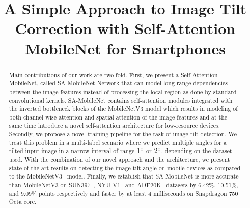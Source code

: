 \documentclass{bmvc2k}
\title{A Simple Approach to Image Tilt Correction with Self-Attention MobileNet for Smartphones}
\begin{document}
\maketitle

\begin{abstract}
Main contributions of our work are two-fold. First, we present a Self-Attention MobileNet, called SA-MobileNet Network that can model long-range dependencies between the image features instead of processing the local region as done by standard convolutional kernels. 
SA-MobileNet contains self-attention modules integrated with the inverted bottleneck blocks of the MobileNetV3 model which results in modeling of both channel-wise attention and spatial attention of the image features and at the same time introduce a novel self-attention architecture for low-resource devices. Secondly, we propose a novel training pipeline for the task of image tilt detection. We treat this problem in a multi-label scenario where we predict multiple angles for a tilted input image in a narrow interval of range $1\degree$ or $2\degree$, depending on the dataset used. 
With the combination of our novel approach and the architecture, we present state-of-the-art results on detecting the image tilt angle on mobile devices as compared to the MobileNetV3~\cite{mobilenetv3} model. Finally, we establish that SA-MobileNet is more accurate than MobileNetV3 on SUN397~\cite{sun397}, NYU-V1~\cite{nyuv1} and ADE20K~\cite{ade20k} datasets by 6.42\%, 10.51\%, and 9.09\% points respectively and faster by at least 4 milliseconds on Snapdragon 750 Octa core.
\end{abstract}
\end{document}
